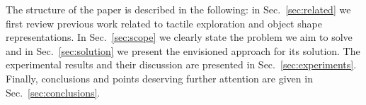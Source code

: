 The structure of the paper is described in the following: in Sec.~\ref{sec:related} we first review previous work related to tactile exploration and object shape representations. In Sec.~\ref{sec:scope} we clearly state the problem we aim to solve and in Sec.~\ref{sec:solution} we present the envisioned approach for its solution. The experimental results and their discussion are presented in Sec.~\ref{sec:experiments}. Finally, conclusions and points deserving further attention are given in Sec.~\ref{sec:conclusions}.










